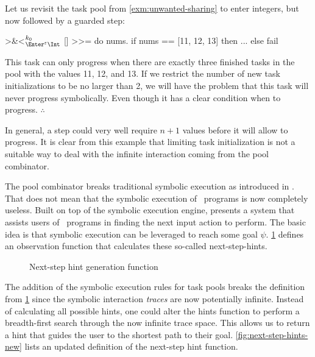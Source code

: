 \begin{example}
  Let us revisit the task pool from \cref{exm:unwanted-sharing} to enter integers,
  but now followed by a guarded step:
  \begin{TASK}[emph={nums}]
    >&<$^{k_0}_{\Enter^\epsilon\Int}$ [] >>= do nums.
    if nums == [11, 12, 13] then ... else fail
  \end{TASK}
  This task can only progress when there are exactly three finished tasks in the pool with the values 11, 12, and 13.
  If we restrict the number of new task initializations to be no larger than 2,
  we will have the problem that this task will never progress symbolically.
  Even though it has a clear condition when to progress.
\hfill$\therefore$\end{example}
In general, a step could very well require $n+1$ values before it will allow to progress.
It is clear from this example that limiting task initialization is not a suitable way to deal with the infinite interaction coming from the pool combinator.

The pool combinator breaks traditional symbolic execution as introduced in \citet{conf/ifl/NausSK19}.
That does not mean that the symbolic execution of \DYNTOPHAT\ programs is now completely useless.
Built on top of the symbolic execution engine, \citet{conf/sfp/NausS20} presents a system that assists users of \TOPHAT\ programs in finding the next input action to perform.
The basic idea is that symbolic execution can be leveraged to reach some goal $\psi$.
\cref{fig:next-step-hints} defines an observation function that calculates these so-called next-step-hints.

\begin{figure}
  \begin{mathpar}
  \end{mathpar}
  \caption{Next-step hint generation function}
  \label{fig:next-step-hints}
\end{figure}

The addition of the symbolic execution rules for task pools breaks the definition from \cref{fig:next-step-hints}
since the symbolic interaction \textit{traces} are now potentially infinite.
Instead of calculating all possible hints,
one could alter the hints function to perform a breadth-first search through the now infinite trace space.
This allows us to return a hint that guides the user to the shortest path to their goal.
\cref{fig:next-step-hints-new} lists an updated definition of the next-step hint function.

